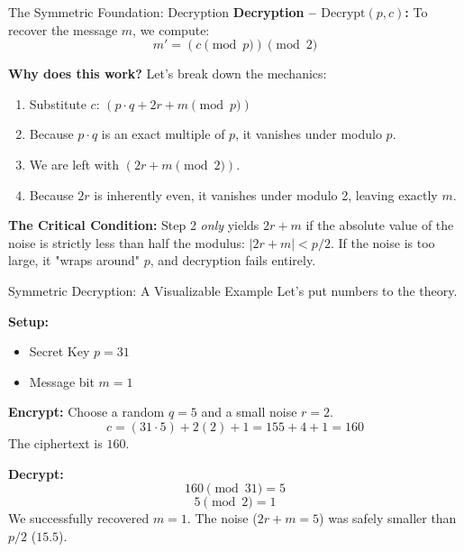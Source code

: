 \documentclass[10pt, aspectratio=169]{beamer}
\begin{document}
\begin{frame}{The Symmetric Foundation: Decryption}
    \textbf{Decryption -- $\text{Decrypt}(p, c)$:}
    To recover the message $m$, we compute:
    $$m' = (c \pmod p) \pmod 2$$
    \pause
    
    \vspace{0.3cm}
    \textbf{Why does this work?} Let's break down the mechanics:
    \begin{enumerate}
        \item Substitute $c$: $(p \cdot q + 2r + m \pmod p)$
        \item Because $p \cdot q$ is an exact multiple of $p$, it vanishes under modulo $p$.
        \item We are left with $(2r + m \pmod 2)$.
        \item Because $2r$ is inherently even, it vanishes under modulo 2, leaving exactly $m$.
    \end{enumerate}
    \pause
    
    \vspace{0.3cm}
    \textbf{The Critical Condition:}
    Step 2 \textit{only} yields $2r + m$ if the absolute value of the noise is strictly less than half the modulus: $|2r + m| < p/2$. If the noise is too large, it "wraps around" $p$, and decryption fails entirely.
\end{frame}

\begin{frame}{Symmetric Decryption: A Visualizable Example}
    Let's put numbers to the theory.
    
    \vspace{0.2cm}
    \textbf{Setup:}
    \begin{itemize}
        \item Secret Key $p = 31$
        \item Message bit $m = 1$
    \end{itemize}
    \pause
    
    \textbf{Encrypt:}
    Choose a random $q = 5$ and a small noise $r = 2$.
    $$c = (31 \cdot 5) + 2(2) + 1 = 155 + 4 + 1 = 160$$
    The ciphertext is $160$.
    \pause
    
    \vspace{0.2cm}
    \textbf{Decrypt:}
    $$160 \pmod{31} = 5$$
    $$5 \pmod 2 = 1$$
    We successfully recovered $m = 1$. The noise ($2r+m = 5$) was safely smaller than $p/2$ ($15.5$).
\end{frame}
\end{document}
